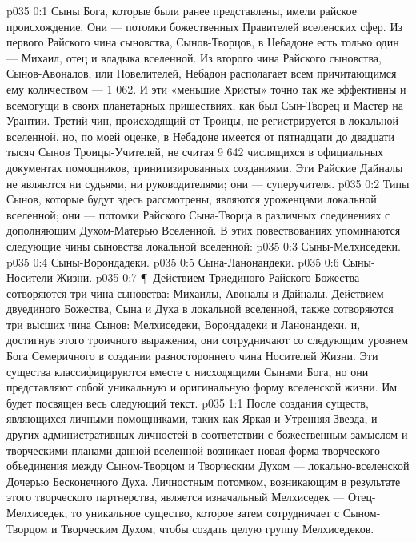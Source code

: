 \vs p035 0:1 Сыны Бога, которые были ранее представлены, имели райское происхождение. Они --- потомки божественных Правителей вселенских сфер. Из первого Райского чина сыновства, Сынов\hyp{}Творцов, в Небадоне есть только один --- Михаил, отец и владыка вселенной. Из второго чина Райского сыновства, Сынов\hyp{}Авоналов, или Повелителей, Небадон располагает всем причитающимся ему количеством --- 1 062. И эти «меньшие Христы» точно так же эффективны и всемогущи в своих планетарных пришествиях, как был Сын\hyp{}Творец и Мастер на Урантии. Третий чин, происходящий от Троицы, не регистрируется в локальной вселенной, но, по моей оценке, в Небадоне имеется от пятнадцати до двадцати тысяч Сынов Троицы\hyp{}Учителей, не считая 9 642 числящихся в официальных документах помощников, тринитизированных созданиями. Эти Райские Дайналы не являются ни судьями, ни руководителями; они --- суперучителя.
\vs p035 0:2 Типы Сынов, которые будут здесь рассмотрены, являются уроженцами локальной вселенной; они --- потомки Райского Сына\hyp{}Творца в различных соединениях с дополняющим Духом\hyp{}Матерью Вселенной. В этих повествованиях упоминаются следующие чины сыновства локальной вселенной:
\vs p035 0:3 \bibnobreakspace Сыны\hyp{}Мелхиседеки.
\vs p035 0:4 \bibnobreakspace Сыны\hyp{}Ворондадеки.
\vs p035 0:5 \bibnobreakspace Сына\hyp{}Ланонандеки.
\vs p035 0:6 \bibnobreakspace Сыны\hyp{}Носители Жизни.
\vs p035 0:7 \P\ Действием Триединого Райского Божества сотворяются три чина сыновства: Михаилы, Авоналы и Дайналы. Действием двуединого Божества, Сына и Духа в локальной вселенной, также сотворяются три высших чина Сынов: Мелхиседеки, Ворондадеки и Ланонандеки, и, достигнув этого троичного выражения, они сотрудничают со следующим уровнем Бога Семеричного в создании разностороннего чина Носителей Жизни. Эти существа классифицируются вместе с нисходящими Сынами Бога, но они представляют собой уникальную и оригинальную форму вселенской жизни. Им будет посвящен весь следующий текст.
\vs p035 1:1 После создания существ, являющихся личными помощниками, таких как Яркая и Утренняя Звезда, и других административных личностей в соответствии с божественным замыслом и творческими планами данной вселенной возникает новая форма творческого объединения между Сыном\hyp{}Творцом и Творческим Духом --- локально\hyp{}вселенской Дочерью Бесконечного Духа. Личностным потомком, возникающим в результате этого творческого партнерства, является изначальный Мелхиседек --- Отец\hyp{}Мелхиседек, то уникальное существо, которое затем сотрудничает с Сыном\hyp{}Творцом и Творческим Духом, чтобы создать целую группу Мелхиседеков.

